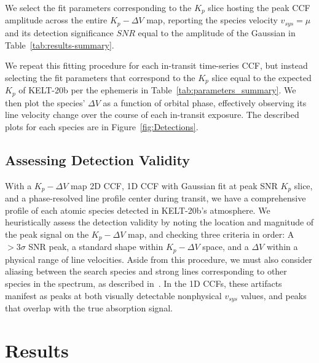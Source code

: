 \documentclass[twocolumn]{aastex631}
\begin{document}
            We select the fit parameters corresponding to the $K_p$ slice hosting the peak CCF amplitude across the entire $K_p-\Delta V$ map, reporting the species velocity $v_{sys} = \mu$ and its detection significance $SNR$ equal to the amplitude of the Gaussian in Table~\ref{tab:results-summary}.
            
            We repeat this fitting procedure for each in-transit time-series CCF, but instead selecting the fit parameters that correspond to the $K_p$ slice equal to the expected $K_p$ of KELT-20b per the ephemeris in Table~\ref{tab:parameters_summary}. We then plot the species' $\Delta V$ as a function of orbital phase, effectively observing its line velocity change over the course of each in-transit exposure. The described plots for each species are in Figure~\ref{fig:Detections}. 

        \subsection{Assessing Detection Validity}\label{subsec:Assessing Detection Results}
            With a ${K_p-\Delta V}$ map 2D CCF, 1D CCF with Gaussian fit at peak SNR $K_p$ slice, and a phase-resolved line profile center during transit, we have a comprehensive profile of each atomic species detected in KELT-20b's atmosphere. We heuristically assess the detection validity by noting the location and magnitude of the peak signal on the ${K_p-\Delta V}$ map, and checking three criteria in order: A $>{3\sigma}$ SNR peak, a standard shape within ${K_p-\Delta V}$ space, and a $\Delta V$ within a physical range of line velocities. Aside from this procedure, we must also consider aliasing between the search species and strong lines corresponding to other species in the spectrum, as described in~\citet{Borsato2023}. In the 1D CCFs, these artifacts manifest as peaks at both visually detectable nonphysical $v_{sys}$ values, and peaks that overlap with the true absorption signal.
            
            
    \section{Results}\label{sec:Results}
\end{document}
